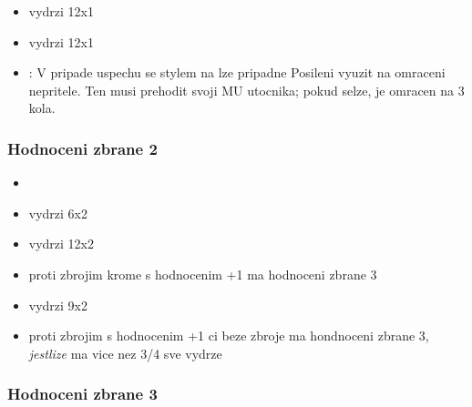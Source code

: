 \begin{Predmet}[Dyka]
\begin{itemize}
	\item vydrzi 12x1
\end{itemize}
\end{Predmet}

\begin{Predmet}[Obusek]
\begin{itemize}
	\item vydrzi 12x1
	\item {}: V pripade uspechu se stylem na  lze pripadne Posileni vyuzit na omraceni nepritele. Ten musi prehodit svoji  MU utocnika; pokud selze, je omracen na 3 kola.
\end{itemize}
\end{Predmet}

\subsubsection{Hodnoceni zbrane 2}
\label{sec:zbrane_dva}

\begin{Predmet}[Sekera]
\begin{itemize}
  \item
  \item vydrzi 6x2
\end{itemize}
\end{Predmet}

\begin{Predmet}[Palcát]
\begin{itemize}
	\item vydrzi 12x2
	\item proti zbrojim krome s hodnocenim +1 ma hodnoceni zbrane 3
\end{itemize}
\end{Predmet}

\begin{Predmet}[Meč]
\begin{itemize}
	\item vydrzi 9x2
	\item proti zbrojim s hodnocenim +1 ci beze zbroje ma hondnoceni zbrane 3, \emph{jestlize} ma vice nez 3/4 sve vydrze
\end{itemize}
\end{Predmet}

\subsubsection{Hodnoceni zbrane 3}
\label{sec:zbrane_treti}

